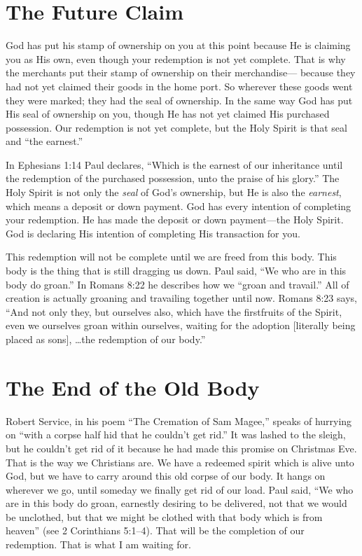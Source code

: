 \section*{The Future Claim}

God has put his stamp of ownership on you at this 
point because He is claiming you as His own, even though 
your redemption is not yet complete. That is why the merchants put their stamp of ownership on their merchandise—
because they had not yet claimed their goods in the home 
port. So wherever these goods went they were marked; they 
had the seal of ownership. In the same way God has put His 
seal of ownership on you, though He has not yet claimed 
His purchased possession. Our redemption is not yet complete, but the Holy Spirit is that seal and “the earnest.”

In Ephesians 1:14 Paul declares, “Which is the earnest of 
our inheritance until the redemption of the purchased possession, unto the praise of his glory.” The Holy Spirit is not 
only the \emph{seal} of God’s ownership, but He is also the \emph{earnest}, 
which means a deposit or down payment. God has every 
intention of completing your redemption. He has made the 
deposit or down payment—the Holy Spirit. God is declaring His intention of completing His transaction for you.

This redemption will not be complete until we are freed 
from this body. This body is the thing that is still dragging 
us down. Paul said, “We who are in this body do groan.” 
In Romans 8:22 he describes how we “groan and travail.” 
All of creation is actually groaning and travailing together 
until now. Romans 8:23 says, “And not only they, but ourselves also, which have the firstfruits of the Spirit, even we 
ourselves groan within ourselves, waiting for the adoption 
[literally being placed as sons], …the redemption of our 
body.”


\section*{The End of the Old Body}

Robert Service, in his poem “The Cremation of Sam 
Magee,” speaks of hurrying on “with a corpse half hid that 
he couldn’t get rid.” It was lashed to the sleigh, but he 
couldn’t get rid of it because he had made this promise on 
Christmas Eve. That is the way we Christians are. We have 
a redeemed spirit which is alive unto God, but we have to 
carry around this old corpse of our body. It hangs on wherever we go, until someday we finally get rid of our load. 
Paul said, “We who are in this body do groan, earnestly 
desiring to be delivered, not that we would be unclothed, 
but that we might be clothed with that body which is from 
heaven” (see 2 Corinthians 5:1–4). That will be the completion of our redemption. That is what I am waiting for.


